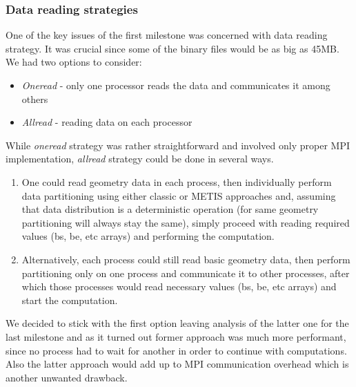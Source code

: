 \documentclass{article}
\begin{document}
\subsubsection{Data reading strategies}
One of the key issues of the first milestone was concerned with data reading strategy. It was crucial since some of the binary files would be as big as 45MB. We had two options to consider:
\begin{itemize}
	\item \textit{Oneread} - only one processor reads the data and communicates it among others
	\item \textit{Allread} - reading data on each processor
\end{itemize}
While \textit{oneread} strategy was rather straightforward and involved only proper MPI implementation, \textit{allread} strategy could be done in several ways. 
\begin{enumerate}
	\item One could read geometry data in each process, then individually perform data partitioning using either classic or METIS approaches and, assuming that data distribution is a deterministic operation (for same geometry partitioning will always stay the same), simply proceed with reading required values (bs, be, etc arrays) and performing the computation.
	\item Alternatively, each process could still read basic geometry data, then perform partitioning only on one process and communicate it to other processes, after which those processes would read necessary values (bs, be, etc arrays) and start the computation.
\end{enumerate}
We decided to stick with the first option leaving analysis of the latter one for the last milestone and as it turned out former approach was much more performant, since no process had to wait for another in order to continue with computations. Also the latter approach would add up to MPI communication overhead which is another unwanted drawback.
\end{document}
